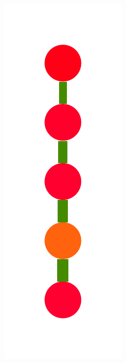 \documentclass[a4paper,10pt]{article}
\begin{document}
\begin{figure}
{    \includegraphics[scale=.14]{./figures/6-3-recursion-induced-1.pdf}
}
\end{figure}
\end{document}
